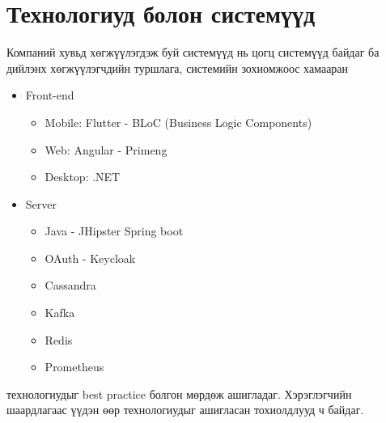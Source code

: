 \section{Технологиуд болон системүүд}
Компаний хувьд хөгжүүлэгдэж буй системүүд нь цогц системүүд байдаг ба дийлэнх хөгжүүлэгчдийн туршлага, системийн зохиомжоос хамааран
\begin{itemize}
	\item Front-end
	\begin{itemize}
		\item Mobile: Flutter - BLoC (Business Logic Components)
		\item Web: Angular - Primeng
		\item Desktop: .NET
	\end{itemize}
	\item Server
	\begin{itemize}
		\item Java - JHipster Spring boot
		\item OAuth - Keycloak
		\item Cassandra
		\item Kafka
		\item Redis
		\item Prometheus
	\end{itemize}
\end{itemize} 
технологиудыг best practice болгон мөрдөж ашигладаг. Хэрэглэгчийн шаардлагаас үүдэн өөр технологиудыг ашигласан тохиолдлууд ч байдаг.